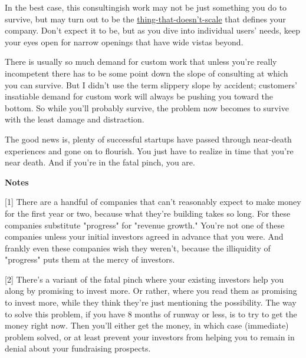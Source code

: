 In the best case, this
                  consultingish work may not be just something you do to
                  survive, but may turn out to be the
                  \href{http://www.paulgraham.com/ds.html}{thing-that-doesn't-scale} that defines
                  your company. Don't expect it to be, but as you dive into
                  individual users' needs, keep your eyes open for narrow
                  openings that have wide vistas beyond.

There is
                  usually so much demand for custom work that unless you're
                  really incompetent there has to be some point down the slope
                  of consulting at which you can survive. But I didn't use the
                  term slippery slope by accident; customers' insatiable demand
                  for custom work will always be pushing you toward the bottom.
                  So while you'll probably survive, the problem now becomes to
                  survive with the least damage and distraction.

The
                  good news is, plenty of successful startups have passed
                  through near-death experiences and gone on to flourish. You
                  just have to realize in time that you're near death. And if
                  you're in the fatal pinch, you are.






                  \textbf{Notes}

[1] There are a handful of companies that can't reasonably
                  expect to make money for the first year or two, because what
                  they're building takes so long. For these companies substitute
                  "progress" for "revenue growth." You're not one of these
                  companies unless your initial investors agreed in advance that
                  you were. And frankly even these companies wish they weren't,
                  because the illiquidity of "progress" puts them at the mercy
                  of investors.

[2] There's a variant of the fatal pinch where your existing
                  investors help you along by promising to invest more. Or
                  rather, where you read them as promising to invest more, while
                  they think they're just mentioning the possibility. The way to
                  solve this problem, if you have 8 months of runway or less, is
                  to try to get the money right now. Then you'll either get the
                  money, in which case (immediate) problem solved, or at least
                  prevent your investors from helping you to remain in denial
                  about your fundraising prospects.

